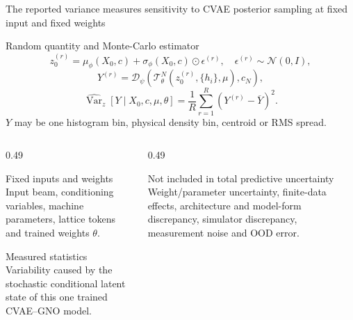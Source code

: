 \begin{frame}[t,shrink=5]{The reported variance measures sensitivity to CVAE posterior sampling at fixed input and fixed weights}
\begin{block}{Random quantity and Monte-Carlo estimator}
\[z_0^{(r)}=\mu_\phi(X_0,c)+\sigma_\phi(X_0,c)\odot\epsilon^{(r)},\quad\epsilon^{(r)}\sim\mathcal N(0,I),\]
\[Y^{(r)}=\mathcal D_\psi\left(\mathcal T_\theta^N(z_0^{(r)},\{h_i\},\mu),c_N\right),\]
\[\widehat{\operatorname{Var}}_z[Y\mid X_0,c,\mu,\theta]=\frac1R\sum_{r=1}^{R}\left(Y^{(r)}-\overline Y\right)^2.\]
$Y$ may be one histogram bin, physical density bin, centroid or RMS spread.
\end{block}
\begin{columns}[T,onlytextwidth]
\begin{column}{0.49\textwidth}
\begin{block}{Fixed inputs and weights}
Input beam, conditioning variables, machine parameters, lattice tokens and trained weights $\theta$.
\end{block}
\begin{block}{Measured statistics}
Variability caused by the stochastic conditional latent state of this one trained CVAE--GNO model.
\end{block}

\end{column}
\begin{column}{0.49\textwidth}
\begin{alertblock}{Not included in total predictive uncertainty}
Weight/parameter uncertainty, finite-data effects, architecture and model-form discrepancy, simulator discrepancy, measurement noise and OOD error.
\end{alertblock}

\end{column}
\end{columns}


\end{frame}

